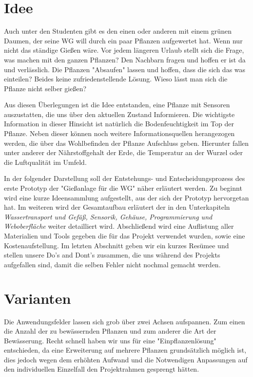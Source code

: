 \documentclass[]{IEEEtran}
\date{\today}
\begin{document}
\section{Idee}\label{refIdee}
Auch unter den Studenten gibt es den einen oder anderen mit einem grünen Daumen, der seine WG will durch ein paar Pflanzen aufgewertet hat. Wenn nur nicht das ständige Gießen wäre. Vor jedem längeren Urlaub stellt sich die Frage, was machen mit den ganzen Pflanzen? Den Nachbarn fragen und hoffen er ist da und verlässlich. Die Pflanzen "Absaufen" lassen und hoffen, dass die sich das was einteilen? Beides keine zufriedenstellende Lösung. Wieso lässt man sich die Pflanze nicht selber gießen?

Aus diesen Überlegungen ist die Idee entstanden, eine Pflanze mit Sensoren auszustatten, die uns über den aktuellen Zustand Informieren. Die wichtigste Information in dieser Hinsicht ist natürlich die Bodenfeuchtigkeit im Top der Pflanze. Neben dieser können noch weitere Informationsquellen herangezogen werden, die über das Wohlbefinden der Pflanze Aufschluss geben. Hierunter fallen unter anderer der Nährstoffgehalt der Erde, die Temperatur an der Wurzel oder die Luftqualität im Umfeld.

In der folgender Darstellung soll der Entstehungs- und Entscheidungsprozess des erste Prototyp der "Gießanlage für die WG"
näher erläutert werden. Zu beginnt wird eine kurze Ideensammlung aufgestellt, aus der sich der Prototyp hervorgetan hat. Im weiteren wird der Gesamtaufbau erläutert der in den Unterkapiteln \emph{Wassertransport und Gefäß, Sensorik, Gehäuse, Programmierung und Weboberfläche} weiter detailliert wird. Abschließend wird eine Auflistung aller  Materialien und Tools gegeben die für das Projekt verwendet wurden, sowie eine Kostenaufstellung. Im letzten Abschnitt geben wir ein kurzes Resümee und stellen unsere Do's and Dont's zusammen, die uns während des Projekts aufgefallen sind, damit die selben Fehler nicht nochmal gemacht werden.



\section{Varianten}
Die Anwendungsfelder lassen sich grob über zwei Achsen aufspannen. Zum einen die Anzahl der zu bewässernden Pflanzen und zum anderer die Art der Bewässerung. Recht schnell haben wir uns für eine "Einpflanzenlösung" entschieden, da eine Erweiterung auf mehrere Pflanzen grundsätzlich möglich ist, dies jedoch wegen dem erhöhten Aufwand und die Notwendigen Anpassungen auf den individuellen Einzelfall den Projektrahmen gesprengt hätten.
\end{document}
